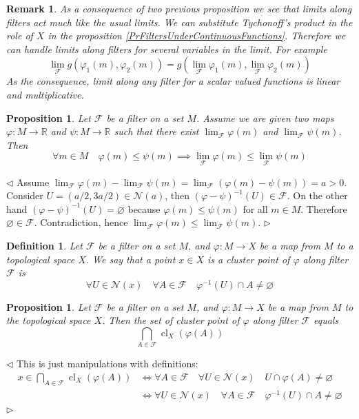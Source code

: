 \documentclass[12pt]{article}
\newtheorem{proposition}[theorem]{Proposition}
\newtheorem{remark}[theorem]{Remark}
\newtheorem{definition}[theorem]{Definition}
\newenvironment{proof}{\par $\triangleleft$}{$\triangleright$}
\begin{document}
\begin{remark}\label{RemBasicPropertiesOfLimitsAlngFilters}
As a consequence of two previous proposition we see that limits along filters act much like the usual limits. We can substitute Tychonoff's product in the role of $X$ in the proposition \ref{PrFiltersUnderContinuousFunctions}. Therefore we can handle limits along filters for several variables in the limit. For example
$$
\lim_{\mathcal{F}}g(\varphi_1(m), \varphi_2(m))
=g(\lim_{\mathcal{F}}\varphi_1(m), \lim_{\mathcal{F}}\varphi_2(m))
$$
As the consequence, limit along any filter for a scalar valued functions is linear and multiplicative. 
\end{remark}

\begin{proposition} Let $\mathcal{F}$ be a filter on a set $M$. Assume we are given two maps $\varphi:M\to\mathbb{R}$ and $\psi:M\to\mathbb{R}$ such that there exist $\lim_{\mathcal{F}}\varphi(m)$ and $\lim_{\mathcal{F}}\psi(m)$. Then
$$
\forall m\in M\quad\varphi(m)\leq\psi(m) \implies 
\lim_{\mathcal{F}}\varphi(m)\leq\lim_{\mathcal{F}}\psi(m)
$$
\end{proposition}
\begin{proof} Assume $\lim_{\mathcal{F}}\varphi(m)-\lim_{\mathcal{F}}\psi(m)=
\lim_{\mathcal{F}}(\varphi(m)-\psi(m))=a>0$. Consider $U=(a/2,3a/2)\in\mathcal{N}(a)$, then $(\varphi-\psi)^{-1}(U)\in\mathcal{F}$. On the other hand $(\varphi-\psi)^{-1}(U)=\varnothing$ because $\varphi(m)\leq\psi(m)$ for all $m\in M$. Therefore $\varnothing\in\mathcal{F}$. Contradiction, hence $\lim_{\mathcal{F}}\varphi(m)\leq\lim_{\mathcal{F}}\psi(m)$.
\end{proof}

\begin{definition}\label{DefClusterPointAlongTheFilter} Let $\mathcal{F}$ be a filter on  a set $M$, and $\varphi:M\to X$ be a map from $M$ to a topological space $X$. We say that a point $x\in X$ is a cluster point of $\varphi$ along filter $\mathcal{F}$ is
$$
\forall U\in\mathcal{N}(x)\quad \forall A\in\mathcal{F} \quad \varphi^{-1}(U)\cap A\neq\varnothing
$$
\end{definition}

\begin{proposition}\label{PrClusterPointAlongTheFilterCharac} Let $\mathcal{F}$ be a filter on  a set $M$, and $\varphi:M\to X$ be a map from $M$ to the topological space $X$. Then the set of cluster point of $\varphi$ along filter $\mathcal{F}$ equals
$$
\bigcap_{A\in\mathcal{F}} \operatorname{cl}_X(\varphi(A))
$$
\end{proposition}
\begin{proof} This is just manipulations with definitions:
$$
\begin{aligned}
x\in \bigcap_{A\in\mathcal{F}} \operatorname{cl}_X(\varphi(A))
&\Longleftrightarrow
\forall A\in\mathcal{F} \quad \forall U\in\mathcal{N}(x) \quad U\cap \varphi(A)\neq\varnothing\\
&\Longleftrightarrow
\forall U\in\mathcal{N}(x)\quad \forall A\in\mathcal{F} \quad \varphi^{-1}(U)\cap A\neq\varnothing\\
\end{aligned}
$$
\end{proof}
\end{document}
